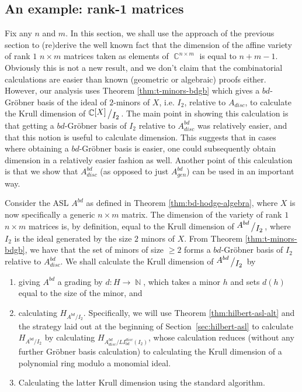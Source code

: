 \documentclass[11pt,reqno]{amsart}
\DeclareMathOperator{\C}{\mathbb{C}}
\DeclareMathOperator{\N}{\mathbb{N}}
\newcommand{\bigslant}[2]{{\raisebox{.2em}{$#1$}\left/\raisebox{-.2em}{$#2$}\right.}}
\newcommand{\gb}{Gr\"{o}bner }
\theoremstyle{definition}
\numberwithin{equation}{section}
\begin{document}
\subsection{An example: rank-1 matrices}
\label{sec:krull-rank-1}

Fix any $n$ and $m$. In this section, we shall use the approach of the previous section to (re)derive the well known fact that the dimension of the affine variety of rank $1$ $n \times m$ matrices taken as elements of $\C^{n \times m}$ is equal to $n + m - 1$. Obviously this is not a new result, and we don't claim that the combinatorial calculations are easier than known (geometric or algebraic) proofs either. However, our analysis uses Theorem \ref{thm:t-minors-bdgb} which gives a $bd$-\gb basis of the ideal of $2$-minors of $X$, i.e. $I_2$, relative to $A_{disc}$, to calculate the Krull dimension of $\bigslant{\C[X]}{I_2}$. %
The main point in showing this calculation is that getting a $bd$-\gb basis of $I_2$ relative to $A^{bd}_{disc}$ was relatively easier, and that this notion is useful to calculate dimension. This suggests that in cases where obtaining a $bd$-\gb basis is easier, one could subsequently obtain dimension in a relatively easier fashion as well. Another point of this calculation is that we show that $A^{bd}_{disc}$ (as opposed to just $A^{bd}_{gen}$) can be used in an important way.

Consider the ASL $A^{bd}$ as defined in Theorem \ref{thm:bd-hodge-algebra}, where $X$ is now specifically a generic $n \times m$ matrix. The dimension of the variety of rank $1$ $n \times m$ matrices is, by definition, equal to the Krull dimension of $\bigslant{A^{bd}}{I_2}$, where $I_2$ is the ideal generated by the size $2$ minors of $X$. From Theorem \ref{thm:t-minors-bdgb}, we have that the set of minors of size $\ge 2$ forms a $bd$-\gb basis of $I_2$ relative to $A^{bd}_{disc}$. We shall calculate the Krull dimension of $\bigslant{A^{bd}}{I_2}$ by 
\begin{enumerate}
\item giving $A^{bd}$ a grading by $d: H \rightarrow \N$, which takes a minor $h$ and sets $d(h)$ equal to the size of the minor, and
\item calculating $H_{A^{bd} / I_2}$. Specifically, we will use Theorem \ref{thm:hilbert-asl-alt} and the strategy laid out at the beginning of Section~\ref{sec:hilbert-asl} to calculate $H_{A^{bd} / I_2}$ by calculating $H_{A^{bd}_{disc} / LI_{bd}^{disc}(I_2)}$, whose calculation reduces (without any further Gröbner basis calculation) to calculating the Krull dimension of a polynomial ring modulo a monomial ideal.

\item Calculating the latter Krull dimension using the standard algorithm.
\end{enumerate}
\end{document}
